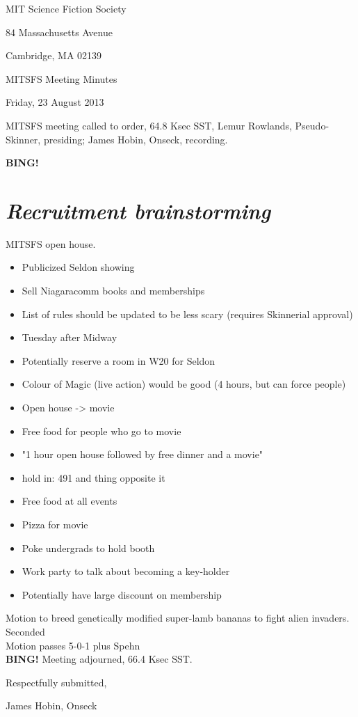 \documentclass[10pt]{article}
\newcommand{\bing}{{\bf BING!} }
\newcommand{\goto}[1]{\bing \vskip 12pt \section*{{\em{#1}}}}
\newcommand{\ps}{ plus Spehn\xspace}
\newcommand{\skinner}{Lemur Rowlands, Pseudo-Skinner}
\newcommand{\onseck}{James Hobin, Onseck}
\newcommand{\meetingdate}{Friday, 23 August 2013}
\begin{document}
\begin{center}

MIT Science Fiction Society

84 Massachusetts Avenue

Cambridge, MA 02139

\vspace{12pt}

MITSFS Meeting Minutes

\meetingdate

\end{center}

\vspace{18pt}

\setlength{\parskip}{6pt}

\noindent
MITSFS meeting called to order, 64.8 Ksec SST,
\skinner, presiding; \onseck, recording.

\goto{Recruitment brainstorming}

MITSFS open house.
\begin{itemize}
\item Publicized Seldon showing
\item Sell Niagaracomm books and memberships
\item List of rules should be updated to be less scary (requires Skinnerial approval)
\item Tuesday after Midway
\item Potentially reserve a room in W20 for Seldon
\item Colour of Magic (live action) would be good (4 hours, but can force people)
\item Open house -> movie
\item Free food for people who go to movie
\item "1 hour open house followed by free dinner and a movie"
\item hold in: 491 and thing opposite it
\item Free food at all events
\item Pizza for movie
\item Poke undergrads to hold booth
\item Work party to talk about becoming a key-holder
\item Potentially have large discount on membership
\end{itemize}

Motion to breed genetically modified super-lamb bananas to fight alien invaders. \\
Seconded \\
Motion passes 5-0-1 \ps \\

\bing
\noindent
Meeting adjourned, 66.4 Ksec SST.

\vspace{18pt}

\centerline{Respectfully submitted,}
\centerline{\onseck}
\end{document}
